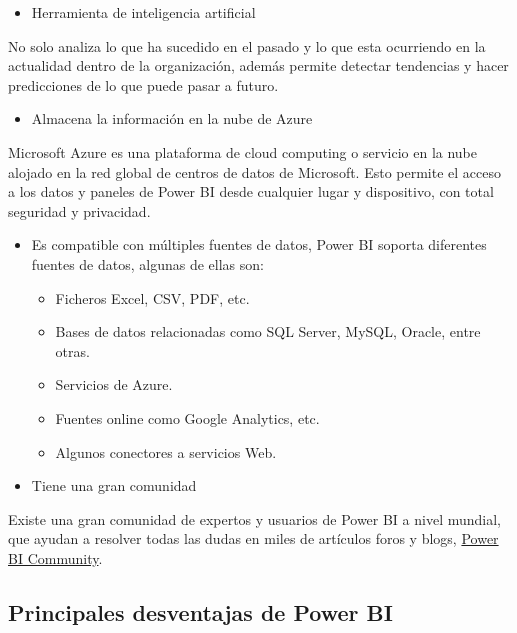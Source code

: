 \documentclass[
]{book}
\providecommand{\tightlist}{%
  \setlength{\itemsep}{0pt}\setlength{\parskip}{0pt}}
\begin{document}
\begin{itemize}
\tightlist
\item
  Herramienta de inteligencia artificial
\end{itemize}

No solo analiza lo que ha sucedido en el pasado y lo que esta ocurriendo en la actualidad dentro de la organización, además permite detectar tendencias y hacer predicciones de lo que puede pasar a futuro.

\begin{itemize}
\tightlist
\item
  Almacena la información en la nube de Azure
\end{itemize}

Microsoft Azure es una plataforma de cloud computing o servicio en la nube alojado en la red global de centros de datos de Microsoft. Esto permite el acceso a los datos y paneles de Power BI desde cualquier lugar y dispositivo, con total seguridad y privacidad.

\begin{itemize}
\tightlist
\item
  Es compatible con múltiples fuentes de datos, Power BI soporta diferentes fuentes de datos, algunas de ellas son:

  \begin{itemize}
  \tightlist
  \item
    Ficheros Excel, CSV, PDF, etc.
  \item
    Bases de datos relacionadas como SQL Server, MySQL, Oracle, entre otras.
  \item
    Servicios de Azure.
  \item
    Fuentes online como Google Analytics, etc.
  \item
    Algunos conectores a servicios Web.
  \end{itemize}
\item
  Tiene una gran comunidad
\end{itemize}

Existe una gran comunidad de expertos y usuarios de Power BI a nivel mundial, que ayudan a resolver todas las dudas en miles de artículos foros y blogs, \href{https://community.powerbi.com/\#}{Power BI Community}.

\hypertarget{principales-desventajas-de-power-bi}{%
\subsection{Principales desventajas de Power BI}\label{principales-desventajas-de-power-bi}}
\end{document}
